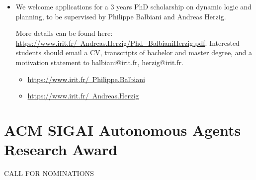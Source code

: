 \documentclass[prodmode,acmtecs]{acmsmall} %
\begin{document}
\begin{itemize}\item  We welcome applications for a 3 years PhD scholarship on dynamic logic and planning, to be supervised by Philippe Balbiani and Andreas Herzig.  
 
  More details can be found here: \href{https://www.irit.fr/~Andreas.Herzig/Phd_BalbianiHerzig.pdf}{https://www.irit.fr/~Andreas.Herzig/Phd\_BalbianiHerzig.pdf}. Interested students should email a CV, transcripts of bachelor and master degree, and a motivation statement to balbiani@irit.fr, herzig@irit.fr. 
 
\begin{itemize}\item  \href{https://www.irit.fr/~Philippe.Balbiani}{https://www.irit.fr/~Philippe.Balbiani}
\item  \href{https://www.irit.fr/~Andreas.Herzig}{https://www.irit.fr/~Andreas.Herzig}
\end{itemize} 
\end{itemize}\section{ACM SIGAI Autonomous Agents Research Award}\label{ACMSIGAIAutonomousAgentsResearchAward}CALL FOR NOMINATIONS 
\end{document}
